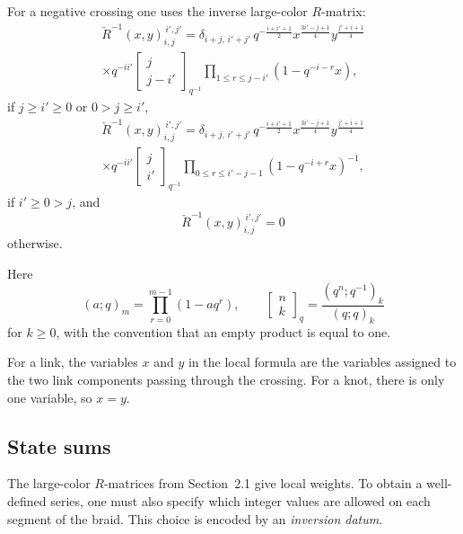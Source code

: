 \documentclass[twocolumn]{article}
\begin{document}
For a negative crossing one uses the inverse large-color $R$-matrix:
\begin{multline}\label{eq:negative-rmatrix-1}
\check{R}^{-1}(x,y)^{\,i',j'}_{i,j}=
\delta_{i+j,\,i'+j'}\,
q^{-\frac{i+i'+1}{2}}
x^{\frac{3i'-j+1}{4}}
y^{\frac{j'+i+1}{4}}
\\
\times q^{-ii'}
\begin{bmatrix} j \\ j-i' \end{bmatrix}_{q^{-1}}
\prod_{1\le r\le j-i'}\left(1-q^{-i-r}x\right),
\end{multline}
if \(j\ge i'\ge 0\) or \(0>j\ge i'\),
\begin{multline}\label{eq:negative-rmatrix-2}
\check{R}^{-1}(x,y)^{\,i',j'}_{i,j}=
\delta_{i+j,\,i'+j'}\,
q^{-\frac{i+i'+1}{2}}
x^{\frac{3i'-j+1}{4}}
y^{\frac{j'+i+1}{4}}
\\
\times q^{-ii'}
\begin{bmatrix} j \\ i' \end{bmatrix}_{q^{-1}}
\prod_{0\le r\le i'-j-1}\left(1-q^{-i+r}x\right)^{-1},
\end{multline}
if \(i'\ge 0>j\), and
\[
  \check{R}^{-1}(x,y)^{\,i',j'}_{i,j}=0
\]
otherwise.

Here
\begin{equation}\label{eq:qbinomial-background}
  (a;q)_m=\prod_{r=0}^{m-1}(1-aq^r),\qquad
  \begin{bmatrix} n \\ k \end{bmatrix}_q
  =\frac{(q^n;q^{-1})_k}{(q;q)_k}
\end{equation}
for \(k\geq 0\), with the convention that an empty product is equal to one.

For a link, the variables \(x\) and \(y\) in the local formula are the variables
assigned to the two link components passing through the crossing.  For a knot,
there is only one variable, so \(x=y\).

\subsection{State sums}

The large-color $R$-matrices from Section~2.1 give local weights.  To obtain a
well-defined series, one must also specify which integer values are allowed on
each segment of the braid.  This choice is encoded by an \emph{inversion datum}.
\end{document}
